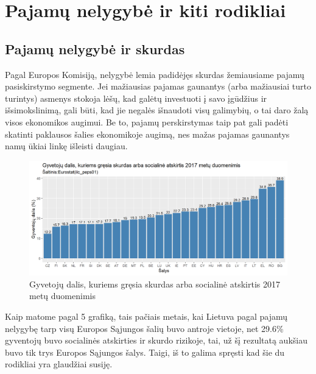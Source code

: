 \documentclass[12pt,a4paper,titlepage]{article}
\begin{document}
\section{Pajamų nelygybė ir kiti rodikliai}
\subsection{Pajamų nelygybė ir skurdas}
Pagal Europos Komisiją, nelygybė lemia padidėjęs skurdas žemiausiame pajamų pasiskirstymo segmente. Jei mažiausias pajamas gaunantys (arba mažiausiai turto turintys) asmenys stokoja lėšų, kad galėtų investuoti į savo įgūdžius ir išsimokslinimą, gali būti, kad jie negalės išnaudoti visų galimybių, o tai daro žalą visos ekonomikos augimui. Be to, pajamų perskirstymas taip pat gali padėti skatinti paklausos šalies ekonomikoje augimą, nes mažas pajamas gaunantys namų ūkiai linkę išleisti daugiau.
\begin{figure}[H]
\includegraphics[scale=0.7]{povertyrisk.png}
\caption{Gyvetojų dalis, kuriems gręsia skurdas arba socialinė atskirtis 2017 metų duomenimis}
\end{figure}
Kaip matome pagal 5 grafiką, tais pačiais metais, kai Lietuva pagal pajamų nelygybę tarp visų Europos Sąjungos šalių buvo antroje vietoje, net 29.6\% gyventojų buvo socialinės atskirties ir skurdo rizikoje, tai, už šį rezultatą aukšiau buvo tik trys Europos Sąjungos šalys. Taigi, iš to galima spręsti kad šie du rodikliai yra glaudžiai susiję.
\end{document}
